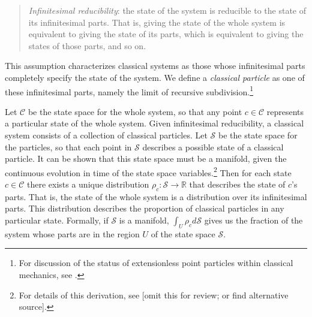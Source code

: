 \documentclass[letterpaper]{article}
\begin{document}
\begin{quotation}
\noindent
\textit{Infinitesimal reducibility}: the state of the system is reducible to the state of its infinitesimal parts. That is, giving the state of the whole system is equivalent to giving the state of its parts, which is equivalent to giving the states of those parts, and so on.
\end{quotation}

\noindent
This assumption characterizes classical systems as those whose infinitesimal parts completely specify the state of the system. We define a \textit{classical particle} as one of these infinitesimal parts, namely the limit of recursive subdivision.\footnote{For discussion of the status of extensionless point particles within classical mechanics, see \textcites[]{Butterfieldpoints}.}

Let $\mathcal{C}$ be the state space for the whole system, so that any point $c \in \mathcal{C}$ represents a particular state of the whole system. Given infinitesimal reducibility, a classical system consists of a collection of classical particles. Let $\mathcal{S}$ be the state space for the particles, so that each point in $\mathcal{S}$ describes a possible state of a classical particle. It can be shown that this state space must be a manifold, given the continuous evolution in time of the state space variables.\footnote{For details of this derivation, see \textcites[]{AoPPhy1} [omit this for review; or find alternative source].} Then for each state $c \in \mathcal{C}$ there exists a unique distribution $\rho_c : \mathcal{S} \to \mathbb{R} $ that describes the state of $c$'s parts. That is, the state of the whole system is a distribution over its infinitesimal parts. This distribution describes the proportion of classical particles in any particular state. Formally, if $\mathcal{S}$ is a manifold, $\int_U \rho_c d\mathcal{S}$ gives us the fraction of the system whose parts are in the region $U$ of the state space $\mathcal{S}$. 
\end{document}
